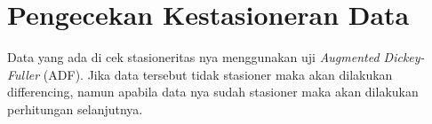 \section{Pengecekan Kestasioneran Data}
Data yang ada di cek stasioneritas nya menggunakan uji \textit{Augmented Dickey-Fuller} (ADF). Jika data tersebut tidak stasioner maka akan dilakukan differencing, namun apabila data nya sudah stasioner maka akan dilakukan perhitungan selanjutnya.